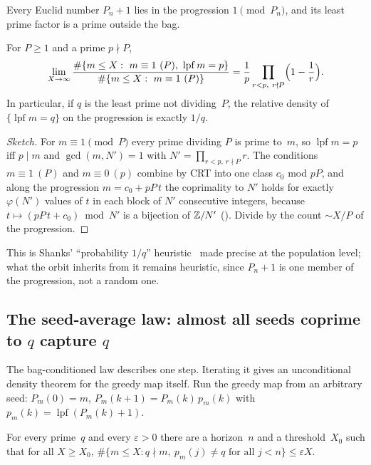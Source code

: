 \documentclass[10pt,a4paper]{article}
\newcommand{\lpf}{\operatorname{lpf}}
\begin{document}
Every Euclid number $P_n+1$ lies in the progression $1\pmod{P_n}$, and its
least prime factor is a prime outside the bag.

\begin{theorem}
For $P\ge1$ and a prime $p\nmid P$,
\[
  \lim_{X\to\infty}\frac{\#\{m\le X:\ m\equiv1\ (P),\ \lpf m=p\}}
  {\#\{m\le X:\ m\equiv1\ (P)\}}
  =\frac1p\prod_{r<p,\ r\nmid P}\Bigl(1-\frac1r\Bigr).
\]
In particular, if $q$ is the least prime not dividing~$P$, the relative
density of $\{\lpf m=q\}$ on the progression is exactly $1/q$.
\end{theorem}

\begin{proof}[Sketch]
For $m\equiv1\pmod P$ every prime dividing $P$ is prime to~$m$, so
$\lpf m=p$ iff $p\mid m$ and $\gcd(m,N')=1$ with
$N'=\prod_{r<p,\ r\nmid P}r$.  The conditions $m\equiv1\ (P)$ and
$m\equiv0\ (p)$ combine by CRT into one class $c_0$ mod $pP$, and along the
progression $m=c_0+pP\,t$ the coprimality to $N'$ holds for exactly
$\varphi(N')$ values of $t$ in each block of $N'$ consecutive integers,
because $t\mapsto(pP\,t+c_0)\bmod N'$ is a bijection of $\mathbb{Z}/N'$
().
Divide by the count $\sim X/P$ of the progression.
\end{proof}

\noindent This is
Shanks' ``probability $1/q$'' heuristic~\cite{Shanks1991} made precise at
the population level; what the orbit inherits from it remains heuristic,
since $P_n+1$ is one member of the progression, not a random one.

\subsection{The seed-average law: almost all seeds coprime to $q$ capture $q$}
\label{sec:seed-average}

The bag-conditioned law describes one step.  Iterating it gives an
unconditional density theorem for the greedy map itself.  Run the greedy
map from an arbitrary seed: $P_m(0)=m$, $P_m(k{+}1)=P_m(k)\,p_m(k)$ with
$p_m(k)=\lpf(P_m(k)+1)$.

\begin{theorem}
\label{thm:almost-all-capture}
For every prime~$q$ and every $\varepsilon>0$ there are a horizon~$n$ and a
threshold~$X_0$ such that for all $X\ge X_0$,
$\#\{m\le X: q\nmid m,\ p_m(j)\ne q \text{ for all } j<n\}\le\varepsilon X$.
\end{theorem}
\end{document}
